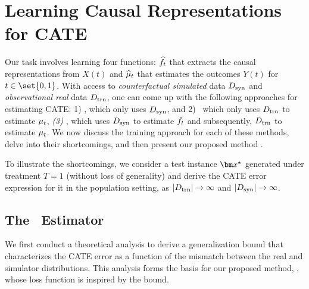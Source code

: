 

\section{Learning Causal Representations for CATE}

\label{sec:theory}
Our task involves learning four functions: $\widehat{f}_t$ that extracts the causal representations from $X(t)$ and $\widehat{\mu}_t$ that estimates the outcomes $Y(t)$ for $t \in \set{0,1}$. With access to \textit{counterfactual simulated} data $D_{\text{syn}}$ and \textit{observational real} data $D_{\text{trn}}$, one can come up with the following approaches for estimating CATE: 1) \simonly, which only uses $D_{\text{syn}}$, and
2) \realonly\, which only uses $D_{\text{trn}}$ to estimate $\mu_t$,
\textit{(3)} \muonly, which uses $D_{\text{syn}}$ to estimate $f_t$ and subsequently, $D_{\text{trn}}$ to estimate $\mu_t$. We now discuss the training approach for each of these methods, delve into their shortcomings, and then present our proposed method \our. 


To illustrate the shortcomings, we consider a test instance $\xb^\star$ generated under treatment $T=1$ (without loss of generality) and derive the CATE error expression for it in the population setting, as $|D_{\text{trn}}| \rightarrow \infty$ and $|D_{\text{syn}}| \rightarrow \infty$.





\subsection{The \our\ Estimator}
\label{sec:simponet}

We first conduct a theoretical analysis to derive a generalization bound that characterizes the CATE error as a function of the mismatch between the real and simulator distributions. This analysis forms the basis for our proposed method, \our, whose loss function is inspired by the bound.

